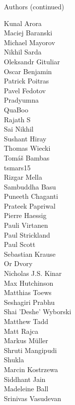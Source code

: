 \documentclass[xcolor=svgnames]{beamer}
\begin{document}
\begin{frame}{Authors (continued)}
\begin{multicols}{5}
          Kunal Arora\\
          Maciej Baranski\\
          Michael Mayorov\\
          Nikhil Sarda\\
          Oleksandr Gituliar\\
          Oscar Benjamin\\
          Patrick Poitras\\
          Pavel Fedotov\\
          Pradyumna\\
          QuaBoo\\
          Rajath S\\
          Sai Nikhil\\
          Sushant Hiray\\
          Thomas Wiecki\\
          Tomáš Bambas\\
          tsmars15\\
          Rizgar Mella\\
          Sambuddha Basu\\
          Puneeth Chaganti\\
          Prateek Papriwal\\
          Pierre Haessig\\
          Pauli Virtanen\\
          Paul Strickland\\
          Paul Scott\\
          Sebastian Krause\\
          Or Dvory\\
          Nicholas J.S. Kinar\\
          Max Hutchinson\\
          Matthias Toews\\
          Seshagiri Prabhu\\
          Shai 'Deshe' Wyborski\\
          Matthew Tadd\\
          Matt Rajca\\
          Markus Müller\\
          Shruti Mangipudi\\
          Shukla\\
          Marcin Kostrzewa\\
          Siddhant Jain\\
          Madeleine Ball\\
          Srinivas Vasudevan\\

\end{multicols}
\end{frame}
\end{document}

